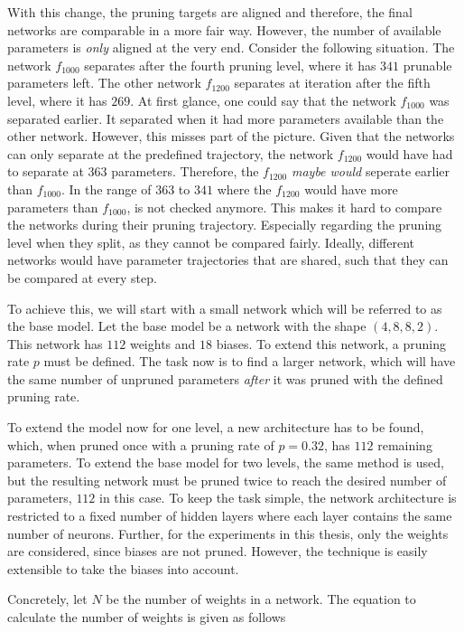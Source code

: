 With this change, the pruning targets are aligned and therefore, the final networks are comparable in a more fair way.
However, the number of available parameters is \textit{only} aligned at the very end.
Consider the following situation.
The network $f_{1000}$ separates after the fourth pruning level, where it has $341$ prunable parameters left. 
The other network $f_{1200}$ separates at iteration after the fifth level, where it has $269$.
At first glance, one could say that the network $f_{1000}$ was separated earlier.
It separated when it had more parameters available than the other network.
However, this misses part of the picture.
Given that the networks can only separate at the predefined trajectory, the network $f_{1200}$ would have had to separate at $363$ parameters.
Therefore, the $f_{1200}$ \textit{maybe would} seperate earlier than $f_{1000}$.
In the range of $363$ to $341$ where the $f_{1200}$ would have more parameters than $f_{1000}$, is not checked anymore.
This makes it hard to compare the networks during their pruning trajectory.
Especially regarding the pruning level when they split, as they cannot be compared fairly.
Ideally, different networks would have parameter trajectories that are shared, such that they can be compared at every step.

To achieve this, we will start with a small network which will be referred to as the base model.
Let the base model be a network with the shape $(4, 8, 8, 2)$.
This network has $112$ weights and $18$ biases.
To extend this network, a pruning rate $p$ must be defined.
The task now is to find a larger network, which will have the same number of unpruned parameters \textit{after} it was pruned with the defined pruning rate.

To extend the model now for one level, a new architecture has to be found, which, when pruned once with a pruning rate of $p=0.32$, has $112$ remaining parameters.
To extend the base model for two levels, the same method is used, but the resulting network must be pruned twice to reach the desired number of parameters, $112$ in this case.
To keep the task simple, the network architecture is restricted to a fixed number of hidden layers where each layer contains the same number of neurons.
Further, for the experiments in this thesis, only the weights are considered, since biases are not pruned.
However, the technique is easily extensible to take the biases into account.

Concretely, let $N$ be the number of weights in a network.
The equation to calculate the number of weights is given as follows

